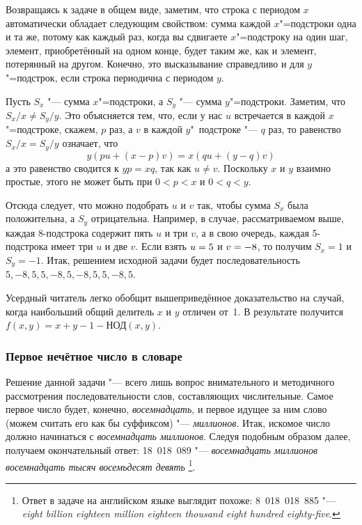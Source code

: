 \documentclass[twoside]{book}
\begin{document}
Возвращаясь к задаче в общем виде, 
заметим, что строка с периодом $x$ автоматически обладает следующим свойством: сумма каждой $x$"=подстроки одна и та же, потому как каждый раз, когда вы сдвигаете $x$"=подстроку на один шаг, элемент, приобретённый на одном конце, будет таким же, как и элемент, потерянный на другом.
Конечно, это высказывание справедливо и для $y$"=подстрок, если строка периодична с периодом $y$.

Пусть $S_x$ "--- сумма $x$"=подстроки, а $S_y$ "--- сумма $y$"=подстроки.
Заметим, что $S_x/x\ne S_y/y$.
Это объясняется тем, что, если у нас $u$ встречается в каждой
 $x$"=подстроке, скажем, $p$ раз, а $v$ в каждой $y$"~под\-строке "--- $q$ раз, 
 то равенство $S_x/x=S_y/y$
 означает, что
\[y(pu+(x-p)v)=x(qu+(y-q)v)\]
а это равенство сводится к $yp=xq$, так как $u\ne v$.
Поскольку $x$ и $y$ взаимно простые, этого не может быть при $0<p<x$ и $0<q<y$.

Отсюда следует, что можно подобрать $u$ и $v$ так, чтобы сумма $S_x$ была положительна, а $S_y$ отрицательна.
Например, в случае, рассматриваемом выше, каждая 8-подстрока содержит пять $u$ и три $v$, 
а в свою очередь, каждая 5-подстрока имеет три $u$ и две $v$.
Если взять $u\z=5$ и $v\z=-8$, то получим $S_x=1$ и $S_y=-1$.
Итак, решением исходной задачи будет последовательность $5,-8,5,5,-8,5,-8,5,5,-8,5$.
\heart

Усердный читатель легко обобщит вышеприведённое доказательство на случай, 
когда наибольший общий делитель $x$ и $y$ отличен от~1.
В результате получится $f(x,y)=x+y-1-\text{НОД}(x,y)$.

\subsubsection*{Первое нечётное число в словаре}%

Решение данной задачи "--- всего лишь вопрос внимательного и методичного рассмотрения последовательности слов, составляющих числительные.
Самое первое число будет, конечно, \emph{восемнадцать}, и первое идущее за ним слово (можем считать его как бы суффиксом) "--- \emph{миллионов}.
Итак, искомое число должно начинаться с \emph{восемнадцать миллионов}.
Следуя подобным образом далее, получаем окончательный ответ: 18~018~089 "--- \emph{восемнадцать миллионов восемнадцать тысяч восемьдесят девять}%
\footnote{Ответ в задаче на английском языке выглядит похоже: 8~018~018~885 "--- \emph{eight billion eighteen million eighteen thousand eight hundred eighty-five}.}.
\heart
\end{document}
